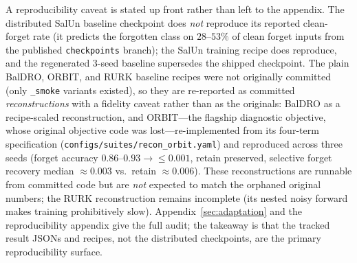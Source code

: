 \documentclass[11pt]{article}
\begin{document}
A reproducibility caveat is stated up front rather than left to the appendix. The distributed SalUn baseline checkpoint does \emph{not} reproduce its reported clean-forget rate (it predicts the forgotten class on $28$--$53\%$ of clean forget inputs from the published \texttt{checkpoints} branch); the SalUn training recipe does reproduce, and the regenerated 3-seed baseline supersedes the shipped checkpoint. The plain BalDRO, ORBIT, and RURK baseline recipes were not originally committed (only \texttt{\_smoke} variants existed), so they are re-reported as committed \emph{reconstructions} with a fidelity caveat rather than as the originals: BalDRO as a recipe-scaled reconstruction, and ORBIT---the flagship diagnostic objective, whose original objective code was lost---re-implemented from its four-term specification (\texttt{configs/suites/recon\_orbit.yaml}) and reproduced across three seeds (forget accuracy $0.86$--$0.93\!\to\!\le\!0.001$, retain preserved, selective forget recovery median $\approx\!0.003$ vs.\ retain $\approx\!0.006$). These reconstructions are runnable from committed code but are \emph{not} expected to match the orphaned original numbers; the RURK reconstruction remains incomplete (its nested noisy forward makes training prohibitively slow). Appendix~\ref{sec:adaptation} and the reproducibility appendix give the full audit; the takeaway is that the tracked result JSONs and recipes, not the distributed checkpoints, are the primary reproducibility surface.
\end{document}
